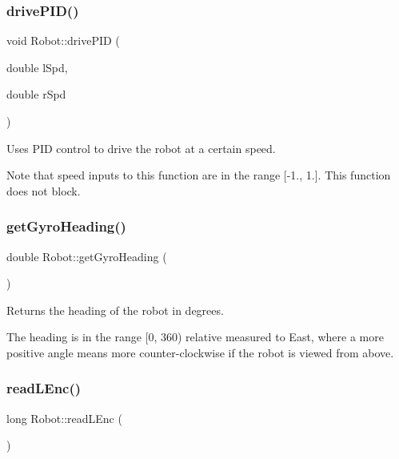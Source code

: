 \subsubsection{\texorpdfstring{drive\+P\+I\+D()}{drivePID()}}
{\footnotesize\ttfamily void Robot\+::drive\+P\+ID (\begin{DoxyParamCaption}\item[{double}]{l\+Spd,  }\item[{double}]{r\+Spd }\end{DoxyParamCaption})\hspace{0.3cm}{\ttfamily [inline]}}



Uses P\+ID control to drive the robot at a certain speed. 

Note that speed inputs to this function are in the range \mbox{[}-\/1., 1.\mbox{]}. This function does not block. \mbox{\label{classRobot_a3352f2f6f716ebe09929ff1e14483717}} 
\subsubsection{\texorpdfstring{get\+Gyro\+Heading()}{getGyroHeading()}}
{\footnotesize\ttfamily double Robot\+::get\+Gyro\+Heading (\begin{DoxyParamCaption}{ }\end{DoxyParamCaption})\hspace{0.3cm}{\ttfamily [inline]}}



Returns the heading of the robot in degrees. 

The heading is in the range \mbox{[}0, 360) relative measured to \textquotesingle{}East\textquotesingle{}, where a more positive angle means more counter-\/clockwise if the robot is viewed from above. \mbox{\label{classRobot_ab85e483abd6bb9eb1a3822b44f66aa35}} 
\subsubsection{\texorpdfstring{read\+L\+Enc()}{readLEnc()}}
{\footnotesize\ttfamily long Robot\+::read\+L\+Enc (\begin{DoxyParamCaption}{ }\end{DoxyParamCaption})\hspace{0.3cm}{\ttfamily [inline]}}

